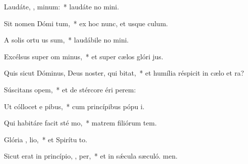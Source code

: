 \item Laudáte, , minum:~* laudáte no mini.
\item Sit nomen Dómi tum,~* ex hoc nunc, et usque  culum.
\item A solis ortu us  sum,~* laudábile no mini.
\item Excélsus super om  minus,~* et super cælos glóri jus.
\item Quis sicut Dóminus, Deus noster, qui   bitat,~* et humília réspicit in cælo et  ra?
\item Súscitans   opem,~* et de stércore éri perem:
\item Ut cóllocet e  pibus,~* cum princípibus pópu i.
\item Qui habitáre facit sté  mo,~* matrem filiórum tem.
\item Glória ,  lio,~* et Spirítu to.
\item Sicut erat in princípio,  ,  per,~* et in sǽcula sæculó. men.
